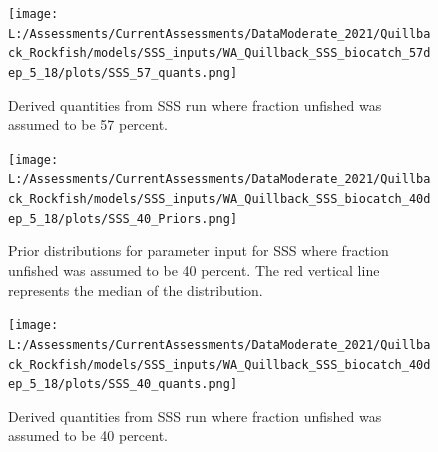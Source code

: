 \documentclass[11pt,
  english,
  a4paper,
]{article}
\begin{document}
\tagmcend\tagstructend

\newpage


\begin{figure}
\centering
\texttt{[image: L:/Assessments/CurrentAssessments/DataModerate\_2021/Quillback\_Rockfish/models/SSS\_inputs/WA\_Quillback\_SSS\_biocatch\_57dep\_5\_18/plots/SSS\_57\_quants.png]}
\caption{Derived quantities from SSS run where fraction unfished was assumed to be 57 percent.\label{fig:sss-quant-57}}
\end{figure}

\tagmcend\tagstructend

\newpage


\begin{figure}
\centering
\texttt{[image: L:/Assessments/CurrentAssessments/DataModerate\_2021/Quillback\_Rockfish/models/SSS\_inputs/WA\_Quillback\_SSS\_biocatch\_40dep\_5\_18/plots/SSS\_40\_Priors.png]}
\caption{Prior distributions for parameter input for SSS where fraction unfished was assumed to be 40 percent. The red vertical line represents the median of the distribution.\label{fig:sss-prior-40}}
\end{figure}

\tagmcend\tagstructend

\newpage


\begin{figure}
\centering
\texttt{[image: L:/Assessments/CurrentAssessments/DataModerate\_2021/Quillback\_Rockfish/models/SSS\_inputs/WA\_Quillback\_SSS\_biocatch\_40dep\_5\_18/plots/SSS\_40\_quants.png]}
\caption{Derived quantities from SSS run where fraction unfished was assumed to be 40 percent.\label{fig:sss-quant-40}}
\end{figure}

\tagmcend\tagstructend

\end{document}
